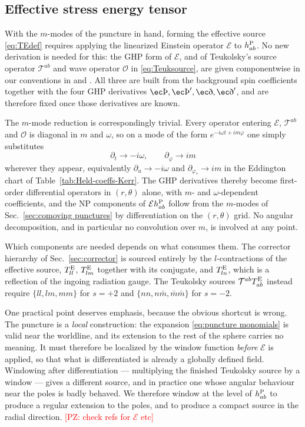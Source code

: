 \documentclass[%
reprint,
 prd,
superscriptaddress,
nofootinbib,
aps,
dvipsnames
]{revtex4-2}
\newcommand{\PZ}[1]{\textcolor{red}{\textsf{[PZ: #1]}}}
\newcommand{\emm}{m}
\def\th{\hbox{\ec\char'336}}
\def\edth{\hbox{\ec\char'360}}
\def\thp{\hbox{\ec\char'336}'}
\def\edthp{\hbox{\ec\char'360}'}
\newcommand{\E}{{\mathcal E}}
\newcommand{\T}{{\mathcal T}}
\renewcommand{\O}{{\mathcal O}}
\let\edth\relax
\def\th{\hbox{\ec\char'336}}
\def\edth{\hbox{\ec\char'360}}
\def\thp{\hbox{\ec\char'336}'}
\def\edthp{\hbox{\ec\char'360}'}
\begin{document}
\subsection{Effective stress energy tensor}
\label{sec:eff source}

With the $m$-modes of the puncture in hand, forming the effective source
\eqref{eq:TEdef} requires applying the linearized Einstein operator $\E$ to
$h^{\rm P}_{ab}$. No new derivation is needed for this: the GHP form of $\E$,
and of Teukolsky's source operator $\T^{ab}$ and wave operator $\O$ in
\eqref{eq:Teuksource}, are given componentwise in our conventions in
\cite{Green:2019nam} and \cite[App.~G]{Hollands:2024iqp}. All three are built
from the background spin coefficients together with the four GHP derivatives
$\th, \thp, \edth, \edthp$, and are therefore fixed once those derivatives
are known.

The $m$-mode reduction is correspondingly trivial. Every operator entering
$\E$, $\T^{ab}$ and $\O$ is diagonal in $\emm$ and $\omega$, so on a mode of
the form $e^{-i\omega t + i\emm\varphi}$ one simply substitutes
\begin{equation}\label{eq:mode substitution}
  \partial_{t} \longrightarrow -i\omega,
  \qquad
  \partial_{\varphi} \longrightarrow i\emm
\end{equation}
wherever they appear, equivalently $\partial_u \to -i\omega$ and
$\partial_{\varphi_*}\to i\emm$ in the Eddington chart of
Table~\ref{tab:Held-coeffs-Kerr}. The GHP derivatives thereby become
first-order differential operators in $(r,\theta)$ alone, with $\emm$- and
$\omega$-dependent coefficients, and the NP components of
$\E h^{\rm P}_{ab}$ follow from the $m$-modes of
Sec.~\ref{sec:comoving punctures} by differentiation on the $(r,\theta)$
grid. No angular decomposition, and in particular no convolution over
$\emm$, is involved at any point.

Which components are needed depends on what consumes them. The corrector
hierarchy of Sec.~\ref{sec:corrector} is sourced entirely by the
$l$-contractions of the effective source, $T^{\rm E}_{ll}$, $T^{\rm E}_{lm}$
together with its conjugate, and $T^{\rm E}_{ln}$, which is a reflection of
the ingoing radiation gauge. The Teukolsky sources
$\T^{ab}T^{\rm E}_{ab}$ instead require $\{ll,lm,mm\}$ for $s=+2$ and
$\{nn,n\bar m,\bar m\bar m\}$ for $s=-2$.

One practical point deserves emphasis, because the obvious shortcut is
wrong. The puncture is a \emph{local} construction: the expansion
\eqref{eq:puncture monomials} is valid near the worldline, and its extension
to the rest of the sphere carries no meaning. It must therefore be localized
by the window function \emph{before} $\E$ is applied, so that what is
differentiated is already a globally defined field. Windowing after
differentiation --- multiplying the finished Teukolsky source by a window ---
gives a different source, and in practice one whose angular behaviour near
the poles is badly behaved. We therefore window at the level of
$h^{\rm P}_{ab}$ to produce a regular extension to the poles, 
and to produce a compact 
source in the radial direction. 
\PZ{check refs for $\E$ etc}
\end{document}
